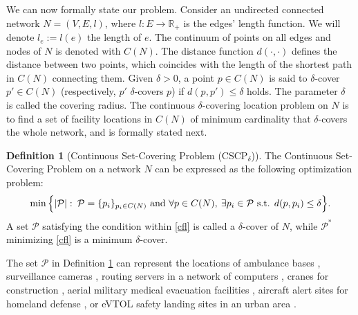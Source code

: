 \documentclass[review]{elsarticle}
\newcommand{\bR}{\mathbb{R}}
\newcommand{\cP}{{\mathcal P}}
\newcommand{\st}{{\text{ s.t. }}}
\newcommand{\dlt}{{\delta}}
\newcommand{\problem}{CSCP$_\dlt$}
\newcommand{\lid}[1]{{\color{red}#1}}
\theoremstyle{definition}
\newtheorem{definition}{Definition}[section]
\begin{document}
We can now formally state our problem. Consider an undirected connected network $N=(V,E,l)$, where $l:E \to \bR_+$ is the edges' length function. We will denote $l_e:=l(e)$ the length of $e$. The continuum of points on all edges and nodes of $N$ is denoted with $C(N)$. The distance function $d(\cdot,\cdot)$ defines the distance between two points, which coincides with the length of the shortest path in $C(N)$ connecting them.  Given $\dlt > 0$, a point $p\in C(N)$ is said to $\dlt$-cover $p'\in C(N)$  (respectively, $p'$ $\dlt$-covers $p$) if $d(p,p')\le \dlt$ holds. The parameter $\dlt$ is called the covering radius. The continuous $\dlt$-covering location problem on $N$ is to find a set of facility locations in $C(N)$ of minimum cardinality that $\dlt$-covers the whole network, and is formally stated next.
\begin{definition}[Continuous Set-Covering Problem (\problem)]\label{def.problem}
The Continuous Set-Covering Problem on a network $N$ can be expressed as the following optimization problem:
\begin{equation}
\label{cfl}
	\min\Big\{|\cP|: \: \cP=\{p_i\}_{p_i\in C(N)} \textup{ and } \forall p\in C(N), \: \exists p_i\in \cP \st d(p,p_i)\leq \dlt\Big\}.
\end{equation}
A set $\cP$ satisfying the condition within \eqref{cfl} is called a $\dlt$-cover of $N$, while $\cP^*$ minimizing \eqref{cfl} is a minimum $\dlt$-cover.
\end{definition}
The set $\mathcal{P}$ in Definition \ref{def.problem} can represent the locations of ambulance bases  \cite{health}, surveillance cameras \cite{Gusev20}, routing servers in a network of computers \cite{worm}, cranes for construction \cite{crane}, aerial military medical evacuation facilities \cite{military}, aircraft alert sites for homeland defense \cite{homeland}, or eVTOL safety landing sites in an urban area \cite{liding}. %
\end{document}
